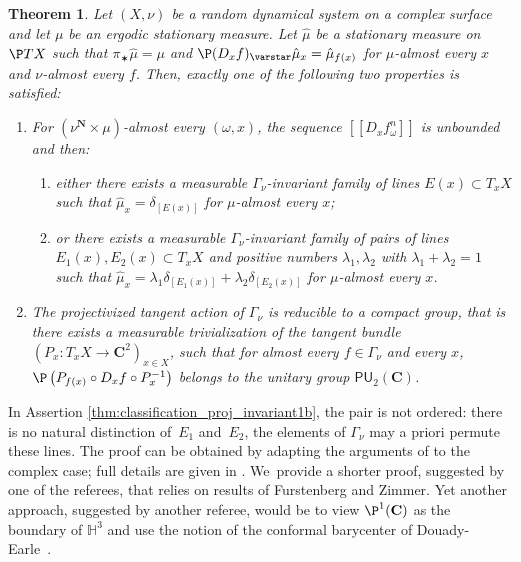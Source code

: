\documentclass[JEP,XML,SOM,Unicode,published]{cedram}
\newcommand{\llbracket}{[\![}
\newcommand{\rrbracket}{]\!]}
\newcommand{\lrpar}[1]{\left(#1\right)}
\newcommand{\inv}{^{-1}}
\def\C{\mathbf{C}}
\def\N{\mathbf{N}}
\theoremstyle{plain}
\newtheorem{thm}{Theorem}[section]
\theoremstyle{definition}
\begin{document}
\begin{thm}\label{thm:classification_proj_invariant}
Let $(X, \nu)$ be a random dynamical system on a complex
surface and let $\mu$ be an ergodic stationary measure. Let
$\hat\mu$ be a stationary measure on $\P TX$ such that $\pi_\varstar {\hat{\mu}}=\mu$ and $\P(D_xf)_\varstar \hat\mu_x = \hat\mu_{f(x)}$
for $\mu$-almost every $x$ and $\nu$-almost every $f$. Then, exactly one of the following two properties is satisfied:
\begin{enumerate}
\item\label{thm:classification_proj_invariant1} For $(\nu^\N\times \mu)$-almost every
$(\omega, x)$, the sequence $\llbracket D_xf^n_\omega\rrbracket$
is unbounded and then:
\begin{enumerate}
\item\label{thm:classification_proj_invariant1a} either there exists a measurable $\Gamma_\nu$-invariant family of lines
$E(x)\subset T_xX$ such that $\hat\mu_x=\delta_{[E(x)]}$ for $\mu$-almost every $x$;
\item\label{thm:classification_proj_invariant1b} or there exists a measurable $\Gamma_\nu$-invariant family of pairs of lines
$E_1(x), E_2(x) \subset T_xX$ and positive numbers $ \lambda_1, \lambda_2$ with
$\lambda_1+\lambda_2 =1$ such that $\hat\mu_x=\lambda_1\delta_{[E_1(x)]} + \lambda_2\delta_{[E_2(x)]}$ for $\mu$-almost every $x$.
\end{enumerate}
\item\label{thm:classification_proj_invariant2} The projectivized tangent action of $\Gamma_\nu$ is reducible to a compact group, that is
there exists a measurable trivialization
of the tangent bundle $(P_x: T_xX \to \C^2)_{x\in X}$, such that for almost
every $f\in \Gamma_\nu$ and every
$x$, $\P\lrpar{P_{f(x)}\circ D_xf\circ P_x\inv}$ belongs to the unitary group $\mathsf{PU}_2(\C)$.
\end{enumerate}
\end{thm}

In Assertion \eqref{thm:classification_proj_invariant1b}, the pair is not ordered: there is no natural distinction of~$E_1$ and~$E_2$,
the elements of $\Gamma_\nu$ may a priori permute these lines.
The proof can be obtained by adapting the arguments of \cite{barrientos-malicet} to the complex case;
full details are given in \cite[\S 7.4]{arxiv-version-of-this-paper}. We~provide a shorter
proof, suggested by
one of the referees, that relies on results of Furstenberg and Zimmer.
Yet another approach, suggested by
another referee, would be to view $\P^1(\C)$ as the boundary of $\mathbb H^3$ and use the notion
of the conformal barycenter of Douady-Earle~\cite{douady-earle}.
\end{document}
